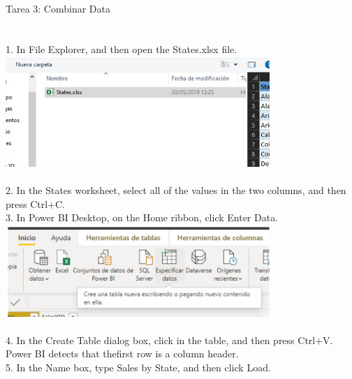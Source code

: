 \documentclass[preprint,12pt]{elsarticle}
\begin{document}
\begin{itemize}
		 		
		 		\\ Tarea 3: Combinar Data \\ 
		 		\\ \\ 1. In File Explorer, and then open the States.xlsx file.
		 		\\ \includegraphics[width=10cm]{./IMAGENES/3.1} \\
		 		\\ 2. In the States worksheet, select all of the values in the two columns, and then press Ctrl+C.
		 		\\ 3. In Power BI Desktop, on the Home ribbon, click Enter Data.
		 		\\ \includegraphics[width=10cm]{./IMAGENES/3.3} \\
		 		\\ 4. In the Create Table dialog box, click in the table, and then press Ctrl+V. Power BI detects that thefirst row is
		 		a column header.
		 		\\ 5. In the Name box, type Sales by State, and then click Load.

\end{itemize}
\end{document}
